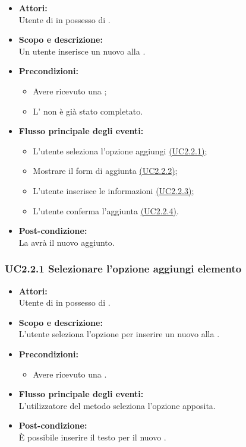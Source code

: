 \begin{itemize}
	\item \textbf{Attori:}
	\\Utente di  in possesso di \ProjectName{}.
	\item \textbf{Scopo e descrizione:} 
	\\Un utente inserisce un nuovo  alla .
	\item \textbf{Precondizioni:}
	\begin{itemize}
		\item Avere ricevuto una  ;
		\item L' non è già stato completato.
	\end{itemize}
	\item \textbf{Flusso principale degli eventi:}
	\begin{itemize}
		\item L'utente seleziona l'opzione aggiungi  \hyperref[UC2.2.1]{(UC2.2.1)};
		\item Mostrare il form di aggiunta \hyperref[UC2.2.2]{(UC2.2.2)};
		\item L'utente inserisce le informazioni \hyperref[UC2.2.3]{(UC2.2.3)};
		\item L'utente conferma l'aggiunta \hyperref[UC2.2.4]{(UC2.2.4)}.
	\end{itemize}
	\item \textbf{Post-condizione:}
	\\La {} avrà il nuovo  aggiunto.
\end{itemize}

\subsubsection{UC2.2.1 Selezionare l'opzione aggiungi elemento} \label{UC2.2.1}

\begin{itemize}
	\item \textbf{Attori:}
	\\Utente di  in possesso di \ProjectName{}.
	\item \textbf{Scopo e descrizione:} 
	\\L'utente seleziona l'opzione per inserire un nuovo  alla .
	\item \textbf{Precondizioni:}
	\begin{itemize}
		\item Avere ricevuto una  .
	\end{itemize}
	\item \textbf{Flusso principale degli eventi:}
	\\L'utilizzatore del metodo seleziona l'opzione apposita.
	\item \textbf{Post-condizione:}
	\\È possibile inserire il testo per il nuovo . 
\end{itemize}

